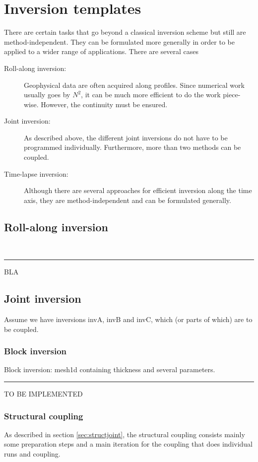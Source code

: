 \documentclass[a4paper,DIV12]{scrartcl}
\newcommand{\sperre}{\,\rule{1ex}{2ex}}
\begin{document}
\section{Inversion templates}
There are certain tasks that go beyond a classical inversion scheme but still are method-independent.
They can be formulated more generally in order to be applied to a wider range of applications.
There are several cases
\begin{description}
\item[Roll-along inversion:] Geophysical data are often acquired along profiles. Since numerical work usually goes by $N^2$, it can be much more efficient to do the work piece-wise. However, the continuity must be ensured.
\item[Joint inversion:] As described above, the different joint inversions do not have to be programmed individually. Furthermore, more than two methods can be coupled.
\item[Time-lapse inversion:] Although there are several approaches for efficient inversion along the time axis, they are method-independent and can be formulated generally.
\end{description}

\subsection{Roll-along inversion}
\sperre{BLA}

\subsection{Joint inversion}
Assume we have inversions invA, invB and invC, which (or parts of which) are to be coupled.

\subsubsection*{Block inversion}
Block inversion: mesh1d containing thickness and several parameters.
\sperre{TO BE IMPLEMENTED}

\subsubsection*{Structural coupling}
As described in section \ref{sec:structjoint}, the structural coupling consists mainly some preparation steps and a main iteration for the coupling that does individual runs and coupling.
\end{document}
